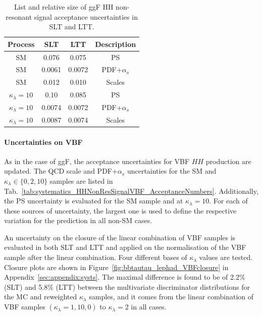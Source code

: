 \begin{table}
    \centering
    \small
    \begin{tabular}{|c|c|c|c|}
        \hline
        Process & SLT & LTT & Description\\
        \hline
        SM   &  0.076 & 0.075 & PS\\
        SM  &  0.0061 &  0.0072 & PDF+$\alpha_s$\\
        SM  &  0.012 &  0.010 & Scales \\
        $\kappa_\lambda=10$  &  0.10 &  0.085 & PS\\
        $\kappa_\lambda=10$  &  0.0074 &  0.0072 & PDF+$\alpha_s$\\
        $\kappa_\lambda=10$  &  0.0087 &  0.0074 & Scales \\
        \hline
    \end{tabular}
    \caption{List and relative size of ggF HH non-resonant signal 
    acceptance uncertainties in SLT and LTT.}
    \label{tab:systematics_HHNonResSignal_AcceptanceNumbers}
\end{table}

\paragraph{Uncertainties on VBF}

As in the case of ggF, the acceptance uncertainties for VBF $HH$ production are updated.
The QCD scale and PDF+$\alpha_s$ uncertainties for the SM and $\kappa_\lambda \in \{0, 2, 10\}$
samples are listed in Tab.~\ref{tab:systematics_HHNonResSignalVBF_AcceptanceNumbers}.
Additionally, the PS uncertainty is evaluated for the SM sample and at $\kappa_\lambda = 10$.
For each of these sources of uncertainty, the largest one is used to define the respective
variation for the prediction in all non-SM cases.

An uncertainty on the closure of the linear combination of VBF samples is evaluated in both 
SLT and LTT and applied on the normalisation of the VBF sample after the linear combination. 
Four different bases of $\kappa_\lambda$ values are tested.
Closure plots are shown in Figure~\ref{fig:bbtautau_lephad_VBFclosure} in 
Appendix~\ref{sec:appendix:systs}. 
The maximal difference is found to be of 
2.2\% (SLT) and 5.8\% (LTT) 
between the multivariate discriminator distributions for the MC 
and reweighted $\kappa_\lambda$ samples, 
and it comes from the linear combination 
of VBF samples $(\kappa_\lambda = 1, 10, 0)$ to  $\kappa_\lambda=2$ in all cases.


